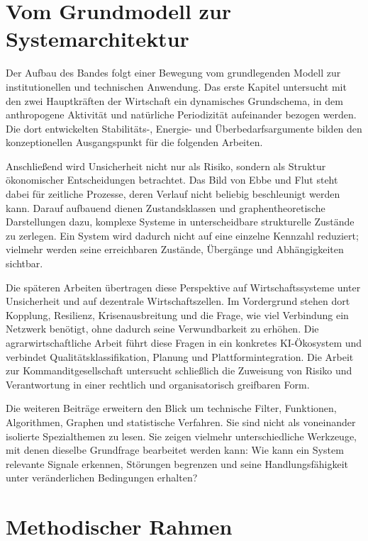 \documentclass[a4paper, 12pt, twoside, openright]{report}
\theoremstyle{definition}
\theoremstyle{definition}
\begin{document}
\section{Vom Grundmodell zur Systemarchitektur}

Der Aufbau des Bandes folgt einer Bewegung vom grundlegenden Modell zur
institutionellen und technischen Anwendung. Das erste Kapitel untersucht mit den
zwei Hauptkräften der Wirtschaft ein dynamisches Grundschema, in dem anthropogene
Aktivität und natürliche Periodizität aufeinander bezogen werden. Die dort
entwickelten Stabilitäts-, Energie- und Überbedarfsargumente bilden den
konzeptionellen Ausgangspunkt für die folgenden Arbeiten.

Anschließend wird Unsicherheit nicht nur als Risiko, sondern als Struktur
ökonomischer Entscheidungen betrachtet. Das Bild von Ebbe und Flut steht dabei
für zeitliche Prozesse, deren Verlauf nicht beliebig beschleunigt werden kann.
Darauf aufbauend dienen Zustandsklassen und graphentheoretische Darstellungen
dazu, komplexe Systeme in unterscheidbare strukturelle Zustände zu zerlegen. Ein
System wird dadurch nicht auf eine einzelne Kennzahl reduziert; vielmehr werden
seine erreichbaren Zustände, Übergänge und Abhängigkeiten sichtbar.

Die späteren Arbeiten übertragen diese Perspektive auf Wirtschaftssysteme unter
Unsicherheit und auf dezentrale Wirtschaftszellen. Im Vordergrund stehen dort
Kopplung, Resilienz, Krisenausbreitung und die Frage, wie viel Verbindung ein
Netzwerk benötigt, ohne dadurch seine Verwundbarkeit zu erhöhen. Die
agrarwirtschaftliche Arbeit führt diese Fragen in ein konkretes KI-Ökosystem und
verbindet Qualitätsklassifikation, Planung und Plattformintegration. Die Arbeit
zur Kommanditgesellschaft untersucht schließlich die Zuweisung von Risiko und
Verantwortung in einer rechtlich und organisatorisch greifbaren Form.

Die weiteren Beiträge erweitern den Blick um technische Filter, Funktionen,
Algorithmen, Graphen und statistische Verfahren. Sie sind nicht als voneinander
isolierte Spezialthemen zu lesen. Sie zeigen vielmehr unterschiedliche
Werkzeuge, mit denen dieselbe Grundfrage bearbeitet werden kann: Wie kann ein
System relevante Signale erkennen, Störungen begrenzen und seine Handlungsfähigkeit
unter veränderlichen Bedingungen erhalten?

\section{Methodischer Rahmen}
\end{document}
